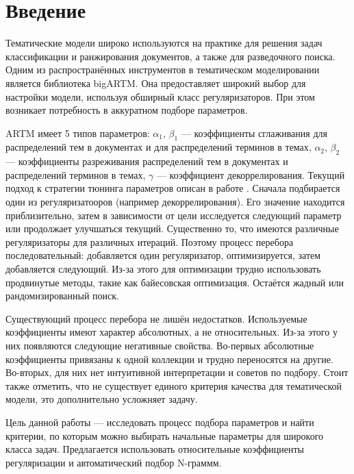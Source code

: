 \documentclass[12pt,twoside]{article}
\title
    {Автоматическая настройка параметров BigARTM под широкий класс задач.}
\author
    {Гришанов~А.\,В., Булатов~B.\,Г., Воронцов~К.\,В.} %
    [Гришанов~А.\,В.$^1$, Булатов~B.\,Г.$^1$, Воронцов~К.\,В.$^1$] %
\begin{document}
\maketitle

\section{Введение}

Тематические модели широко используются на практике для решения задач классификации и ранжирования документов, а также для разведочного поиска\cite{Ianina2016}. Одним из распространённых инструментов в тематическом моделировании является библиотека bigARTM\cite{vorontsov2015bigartm}. Она предоставляет широкий выбор для настройки модели, используя обширный класс регуляризаторов. При этом возникает потребность в аккуратном подборе параметров.

ARTM имеет 5 типов параметров: $\alpha_1$, $\beta_1$ --- коэффициенты сглаживания для распределений тем в документах и для распределений терминов в темах, $\alpha_2$, $\beta_2$ --- коэффициенты разреживания распределений тем в документах и распределений терминов в темах, $\gamma$ --- коэффициент декоррелирования. 
Текущий подход к стратегии тюнинга параметров описан в работе \cite{Ianina2016}. Сначала подбирается один из регуляризатооров (например декоррелирования).  Его значение находится приблизительно, затем в зависимости от цели исследуется следующий параметр или продолжает улучшаться текущий. Существенно то, что имеются различные регуляризаторы  для различных итераций. Поэтому процесс перебора последовательный: добавляется один регуляризатор, оптимизируется, затем добавляется следующий. Из-за этого для оптимизации трудно использовать продвинутые методы, такие как байесовская оптимизация. Остаётся жадный или рандомизированный поиск.

Существующий процесс перебора не лишён недостатков. Используемые коэффициенты имеют характер абсолютных, а не относительных. Из-за этого у них появляются следующие негативные свойства. Во-первых абсолютные коэффициенты привязаны к одной коллекции и трудно переносятся на другие. Во-вторых, для них нет интуитивной интерпретации и советов по подбору. Стоит также отметить, что не существует единого критерия качества для тематической модели, это дополнительно усложняет задачу.

Цель данной работы --- исследовать процесс подбора параметров и найти критерии, по которым можно выбирать начальные параметры для широкого класса задач. Предлагается использовать относительные коэффициенты регуляризации и автоматический подбор N-граммм.
\end{document}
